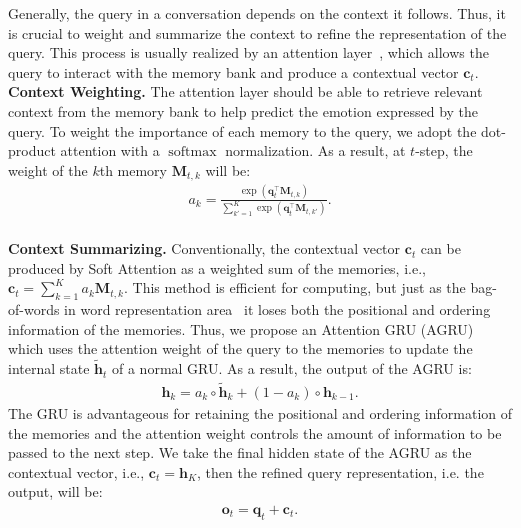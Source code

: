 \documentclass[letterpaper]{article} %
\DeclareMathOperator{\softmax}{softmax}
\begin{document}
Generally, the query in a conversation depends on the context it follows. Thus, it is crucial to weight and summarize the context to refine the representation of the query. This process is usually realized by an attention layer~\cite{DBLP:conf/emnlp/HazarikaPMCZ18,DBLP:conf/naacl/HazarikaPZCMZ18}, which allows the query to interact with the memory bank and produce a contextual vector $\mathbf{c}_t$.
\\[1ex]
\noindent\textbf{Context Weighting.} The attention layer should be able to retrieve relevant context from the memory bank to help predict the emotion expressed by the query. To weight the importance of each memory to the query, we adopt the dot-product attention with a $\softmax$ normalization. As a result, at $t$-step, the weight of the $k$th memory $\mathbf{M}_{t,k}$ will be:
\begin{align}
    a_k = \frac{\exp(\mathbf{q}_t^\top\mathbf{M}_{t,k})}{\sum_{k'=1}^K \exp(\mathbf{q}_t^\top\mathbf{M}_{t,k'})}.
\end{align}
\\[1ex]
\noindent\textbf{Context Summarizing.}
Conventionally, the contextual vector $\mathbf{c}_t$ can be produced by Soft Attention as a weighted sum of the memories, i.e., $\mathbf{c}_t = \sum_{k=1}^{K}a_k\mathbf{M}_{t,k}$. This method is efficient for computing, but just as the bag-of-words in word representation area~\cite{DBLP:conf/nips/MikolovSCCD13,DBLP:conf/emnlp/LingTAFDBTL15} it loses both the positional and ordering information of the memories. Thus, we propose an Attention GRU (AGRU) which uses the attention weight of the query to the memories to update the internal state $\tilde{\mathbf{h}}_t$ of a normal GRU. As a result, the output of the AGRU is:
\begin{align}
    \mathbf{h}_k = a_k\circ\tilde{\mathbf{h}}_k + (1 - a_k)\circ\mathbf{h}_{k-1}.
\end{align}
The GRU is advantageous for retaining the positional and ordering information of the memories and the attention weight controls the amount of information to be passed to the next step. We take the final hidden state of the AGRU as the contextual vector, i.e., $\mathbf{c}_t=\mathbf{h}_K$, then the refined query representation, i.e. the output, will be: 
\begin{align}
    \mathbf{o}_t = \mathbf{q}_t + \mathbf{c}_t.
\end{align}
\end{document}
